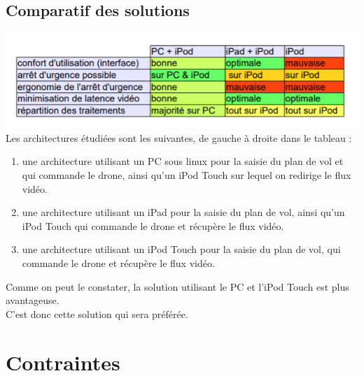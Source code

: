 \documentclass{article}
\begin{document}
	\subsection{Comparatif des solutions}
	  \includegraphics{comparatif.PNG}\\
	  Les architectures étudiées sont les suivantes, de gauche à droite dans le tableau : 
	  \begin{enumerate}
        \item une architecture utilisant un PC sous linux pour la saisie du plan de vol et qui commande le drone, ainsi qu'un iPod Touch sur lequel on redirige le flux vidéo.
        \item une architecture utilisant un iPad pour la saisie du plan de vol, ainsi qu'un iPod Touch qui commande le drone et récupère le flux vidéo.
         \item une architecture utilisant un iPod Touch pour la saisie du plan de vol, qui commande le drone et récupère le flux vidéo.
        \end{enumerate}
        Comme on peut le constater, la solution utilisant le PC et l'iPod Touch est plus avantageuse.\\
        C'est donc cette solution qui sera préférée.
\section{Contraintes}
\end{document}
